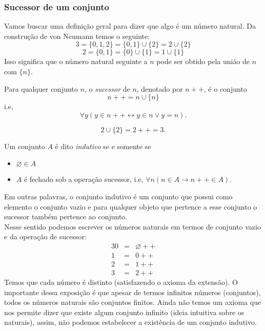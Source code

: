       \subsubsection{Sucessor de um conjunto}
         Vamos buscar uma definição geral para dizer que algo é um número natural.
         Da construção de von Neumann temos o seguinte:
         $$3 = \{0,1,2\} = \{0,1\} \cup \{2\} = 2 \cup \{2\}$$
         $$2 = \{0,1\} = \{0\} \cup \{1\} = 1 \cup \{1\}$$
         Isso significa que o número natural seguinte a $n$ pode ser obtido pela união 
         de $n$ com $\{n\}$.
         \begin{definition}
            Para qualquer conjunto $n$, o \emph{sucessor} de $n$, 
            denotado por $n++$, é o conjunto $$n++ = n \cup \{n\}$$
            i.e, $$\forall y(y \in n++ \leftrightarrow y \in n \lor y = n).$$
         \end{definition}
         \begin{exmp}
            $$2 \cup \{2\} = 2++ = 3.$$
         \end{exmp}
         \begin{definition}
            Um conjunto $A$ é dito \emph{indutivo} se e somente se
            \begin{itemize}
               \item $\varnothing \in A$
               \item $A$ é fechado sob a operação sucessor, i.e, 
                  $\forall n (n \in A \rightarrow n++ \in A).$
            \end{itemize}
         \end{definition}
         Em outras palavras, o conjunto indutivo é um conjunto que possui 
         como elemento o conjunto vazio e para qualquer objeto que 
         pertence a esse conjunto o sucessor também pertence ao conjunto.\\
         Nesse sentido podemos escrever os números naturais em termos 
         de conjunto vazio e da operação de sucessor:
         \begin{alignat}{3}
            \nonumber 0 &=& \varnothing ++\\
            \nonumber 1 &=& 0++\\
            \nonumber 2 &=& 1++\\
            \nonumber 3 &=& 2++
         \end{alignat}
         Temos que cada número é distinto (satisfazendo o axioma da extensão). 
         O importante dessa exposição é que apesar de termos infinitos 
         números (conjuntos), todos os números naturais são conjuntos finitos. 
         Ainda não temos um axioma que nos permite dizer que existe algum conjunto
         infinito (ideia intuitiva sobre os naturais), assim, não podemos 
         estabelecer a existência de um conjunto indutivo.

